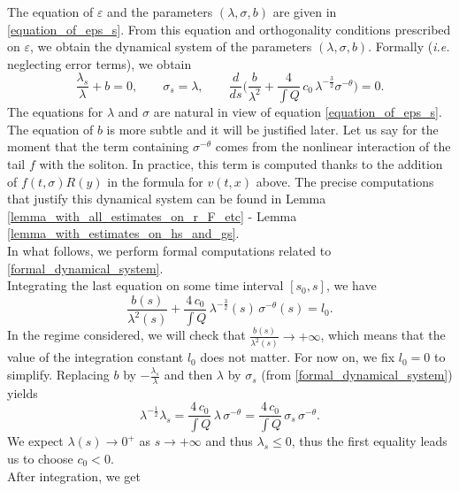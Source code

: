 \documentclass[16pt,english, oneside,reqno]{smfart}
\newcommand{\vare}{{\varepsilon}}
\begin{document}
\begin{enumerate}
    The equation of $\vare$ and the parameters $(\lambda,\sigma,b)$ are given in \eqref{equation_of_eps_s}.
 From this equation and orthogonality conditions prescribed on $\vare$, we obtain 
 the dynamical system of the parameters $(\lambda,\sigma,b)$. 
 Formally (\emph{i.e.} neglecting error terms), we obtain
    \begin{equation}\label{formal_dynamical_system}
        \frac{\lambda_s}{\lambda}+b = 0, \qquad \sigma_s = \lambda, \qquad \frac{d}{ds}\Big( \frac{b}{\lambda^2} + \frac{4}{\int Q}\,c_0 \,\lambda^{-\frac{3}{2}}\sigma^{-\theta} \Big) = 0.
    \end{equation}
    The equations for $\lambda$ and $\sigma$ are natural in view of equation \eqref{equation_of_eps_s}. The equation of $b$ is more subtle and it will be justified later.
    Let us say for the moment that the term containing $\sigma^{-\theta}$ comes from the nonlinear interaction of the tail $f$ with the soliton. In practice, this term is computed thanks to the addition of $f(t,\sigma) R(y)$ in the formula for $v(t,x)$ above.
    The precise computations that justify this dynamical system can be found in Lemma \ref{lemma_with_all_estimates_on_r_F_etc} - Lemma \ref{lemma_with_estimates_on_hs_and_gs}.\\
    In what follows, we perform formal computations related to \eqref{formal_dynamical_system}.\\
    Integrating the last equation on some time interval $[s_0,s]$, we have 
    \begin{equation}\label{equation_with_l0}
        \frac{b(s)}{\lambda^2(s)} + \frac{4\,c_0}{\int Q}\,\lambda^{-\frac 32}(s)\,\sigma^{-\theta}(s) = l_0 .
    \end{equation}
    In the regime considered, we will check that $\frac{b(s)}{\lambda^2(s)}\to +\infty$, which
    means that the value of the integration constant $l_0$ does not matter.
    For now on, we fix $l_0 = 0$ to simplify.
    Replacing $b$ by $-\frac{\lambda_s}{\lambda}$ and then $\lambda$ by $\sigma_s$ (from \eqref{formal_dynamical_system}) yields
    \begin{equation}
        \lambda^{-\frac 12}\lambda_s  = \frac{4\,c_0}{\int Q}\, \lambda\,\sigma^{-\theta} = \frac{4\,c_0}{\int Q}\,\sigma_s\,\sigma^{-\theta}.
    \end{equation}
    We expect $\lambda(s)\to 0^+$ as $s\to +\infty$ and thus $\lambda_s\leq 0$, thus the first equality leads us to choose $c_0<0$.\\
    After integration, we get 
    \begin{equation}\label{l1}

\end{equation}
\end{enumerate}
\end{document}
